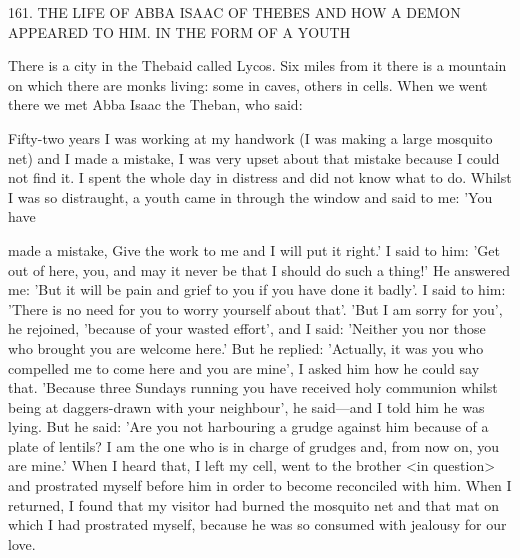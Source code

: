 161. THE LIFE OF ABBA ISAAC OF THEBES AND
HOW A DEMON APPEARED TO HIM.
IN THE FORM OF A YOUTH

There is a city in the Thebaid called Lycos. Six miles from it there
is a mountain on which there are monks living: some in caves,
others in cells. When we went there we met Abba Isaac the Theban,
who said:

Fifty-two years I was working at my handwork (I was making a
large mosquito net) and I made a mistake, I was very upset about
that mistake because I could not find it. I spent the whole day in
distress and did not know what to do. Whilst I was so distraught,
a youth came in through the window and said to me: 'You have

made a mistake, Give the work to me and I will put it right.' I said
to him: 'Get out of here, you, and may it never be that I should do
such a thing!' He answered me: 'But it will be pain and grief to you
if you have done it badly'. I said to him: 'There is no need for you
to worry yourself about that'. 'But I am sorry for you', he rejoined,
'because of your wasted effort', and I said: 'Neither you nor those
who brought you are welcome here.' But he replied: 'Actually, it
was you who compelled me to come here and you are mine', I asked
him how he could say that. 'Because three Sundays running you
have received holy communion whilst being at daggers-drawn with
your neighbour', he said—and I told him he was lying. But he said:
'Are you not harbouring a grudge against him because of a plate of
lentils? I am the one who is in charge of grudges and, from now on,
you are mine.' When I heard that, I left my cell, went to the brother
<in question> and prostrated myself before him in order to become
reconciled with him. When I returned, I found that my visitor had
burned the mosquito net and that mat on which I had prostrated
myself, because he was so consumed with jealousy for our love.

